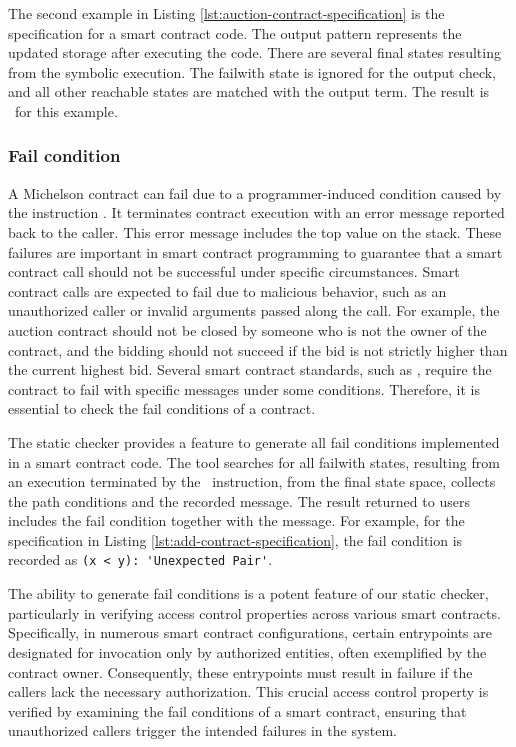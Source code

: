 \documentclass[a4paper,UKenglish,cleveref, autoref, thm-restate]{lipics-v2021}
\begin{document}
The second example in Listing \ref{lst:auction-contract-specification} is the specification for a smart contract code. The output pattern represents the updated storage after executing the code. There are several final states resulting from the symbolic execution. The failwith state is ignored for the output check, and all other reachable states are matched with the output term. The result is \TRUE\ for this example.

\subsubsection{Fail condition}
A Michelson contract can fail due to a programmer-induced condition caused by the instruction \FAILWITH. It terminates contract execution with an error message reported back to the caller. This error message includes the top value on the stack. These failures are important in smart contract programming to guarantee that a smart contract call should not be successful under specific circumstances. Smart contract calls are expected to fail due to malicious behavior, such as an unauthorized caller or invalid arguments passed along the call. For example, the auction contract should not be closed by someone who is not the owner of the contract, and the bidding should not succeed if the bid is not strictly higher than the current highest bid. Several smart contract standards, such as , require the contract to fail with specific messages under some conditions. Therefore, it is essential to check the fail conditions of a contract. 

The static checker provides a feature to generate all fail conditions implemented in a smart contract code. The tool searches for all failwith states, resulting from an execution terminated by the \FAILWITH\ instruction, from the final state space, collects the path conditions and the recorded message. The result returned to users includes the fail condition together with the message. For example, for the specification in Listing \ref{lst:add-contract-specification}, the fail condition is recorded as \lstinline/(x < y): 'Unexpected Pair'/. 

The ability to generate fail conditions is a potent feature of our static checker, particularly in verifying access control properties across various smart contracts. Specifically, in numerous smart contract configurations, certain entrypoints are designated for invocation only by authorized entities, often exemplified by the contract owner. Consequently, these entrypoints must result in failure if the callers lack the necessary authorization. This crucial access control property is verified by examining the fail conditions of a smart contract, ensuring that unauthorized callers trigger the intended failures in the system.
\end{document}
